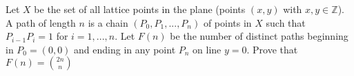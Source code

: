 Let $X$ be the set of all lattice points in the plane (points $(x, y)$ with $x, y \in \mathbb{Z}$). A path of length $n$ is a chain $(P_0, P_1, ... , P_n)$ of points in $X$ such that $P_{i-1}P_i = 1$ for $i = 1, ... , n$. Let $F(n)$ be the number of distinct paths beginning in $P_0=(0,0)$ and ending in any point $P_n$ on line $y = 0$. Prove that $F(n) = \binom{2n}{n}$